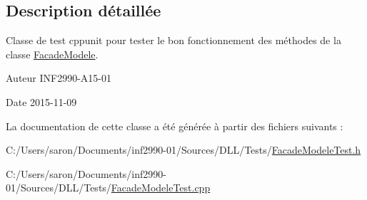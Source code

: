 \subsection{Description détaillée}
Classe de test cppunit pour tester le bon fonctionnement des méthodes de la classe \hyperlink{class_facade_modele}{Facade\-Modele}. 

\begin{DoxyAuthor}{Auteur}
I\-N\-F2990-\/\-A15-\/01 
\end{DoxyAuthor}
\begin{DoxyDate}{Date}
2015-\/11-\/09 
\end{DoxyDate}


La documentation de cette classe a été générée à partir des fichiers suivants \-:\begin{DoxyCompactItemize}
\item 
C\-:/\-Users/saron/\-Documents/inf2990-\/01/\-Sources/\-D\-L\-L/\-Tests/\hyperlink{_facade_modele_test_8h}{Facade\-Modele\-Test.\-h}\item 
C\-:/\-Users/saron/\-Documents/inf2990-\/01/\-Sources/\-D\-L\-L/\-Tests/\hyperlink{_facade_modele_test_8cpp}{Facade\-Modele\-Test.\-cpp}\end{DoxyCompactItemize}
